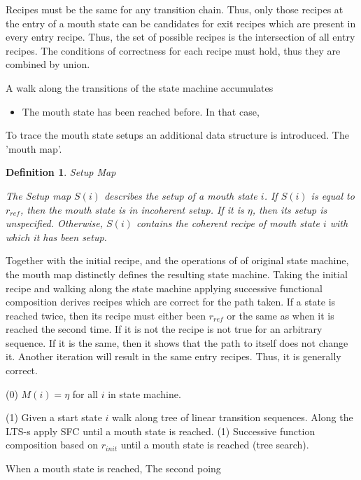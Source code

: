 \documentclass[12pt,a4paper]{scrartcl}
\newtheorem{definition}{Definition}
\begin{document}
Recipes must be the same for any transition chain. Thus, only those recipes at
the entry of a mouth state can be candidates for exit recipes which are present
in every entry recipe. Thus, the set of possible recipes is the intersection of
all entry recipes. The conditions of correctness for each recipe must hold,
thus they are combined by union.

A walk along the transitions of the state machine accumulates
\begin{itemize}
   \item The mouth state has been reached before. In that case,

    
\end{itemize}


To trace the mouth state setups an additional data structure is introduced. The
'mouth map'. 

\begin{definition} Setup Map

    The Setup map $S(i)$ describes the setup of a mouth state $i$. If $S(i)$ is
    equal to $r_{ref}$, then the mouth state is in incoherent setup. If it is $\eta$, 
    then its setup is unspecified. Otherwise, $S(i)$ contains the coherent recipe
    of mouth state $i$ with which it has been setup. 
    
\end{definition}

Together with the initial recipe, and the operations of of original state
machine, the mouth map distinctly defines the resulting state machine. 
Taking the initial recipe and walking along the state machine applying 
successive functional composition derives recipes which are correct for the
path taken. If a state is reached twice, then its recipe must either been
$r_{ref}$ or the same as when it is reached the second time. If it is not
the recipe is not true for an arbitrary sequence. If it is the same, then
it shows that the path to itself does not change it. Another iteration 
will result in the same entry recipes. Thus, it is generally correct.

    (0) $M(i) = \eta$ for all $i$ in state machine.
        
    (1) Given a start state $i$ walk along tree of linear transition 
        sequences. Along the LTS-s apply SFC until a mouth state is 
        reached. 
(1) Successive function composition based on $r_{init}$ until a mouth state
    is reached (tree search).

    When a mouth state is reached, 
The second poing 
\end{document}
